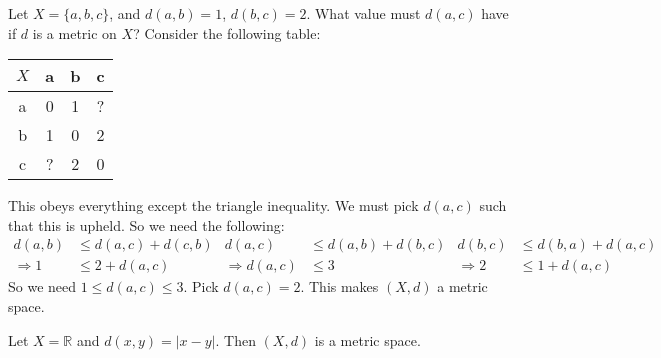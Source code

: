 \documentclass[crop=false,class=book,oneside]{standalone}
\begin{document}
            \begin{example}
                Let $X=\{a,b,c\}$, and
                $d(a,b)=1$, $d(b,c)=2$. What value
                must $d(a,c)$ have if $d$ is a metric on $X$?
                Consider the following table:
                \begin{table}[H]
                    \captionsetup{type=table}
                    \centering
                    \begin{tabular}{|c|c|c|c|}
                        \hline
                        $X$&a&b&c\\
                        \hline
                        a&0&1&?\\
                        \hline
                        b&1&0&2\\
                        \hline
                        c&?&2&0\\
                        \hline
                    \end{tabular}
                \end{table}
                This obeys everything except the triangle
                inequality. We must pick $d(a,c)$
                such that this is upheld.
                So we need the following:
                \begin{align*}
                    d(a,b)&\leq{d(a,c)+d(c,b)}&
                    d(a,c)&\leq{d(a,b)+d(b,c)}&
                    d(b,c)&\leq{d(b,a)+d(a,c)}\\
                    \Rightarrow{1}&\leq{2+d(a,c)}&
                    \Rightarrow{d(a,c)}&\leq{3}&
                    \Rightarrow{2}&\leq{1+d(a,c)}
                \end{align*}
                So we need $1\leq{d(a,c)}\leq{3}$.
                Pick $d(a,c)=2$.
                This makes $(X,d)$ a metric space.
            \end{example}
            \begin{example}
                Let $X=\mathbb{R}$ and $d(x,y)=|x-y|$.
                Then $(X,d)$ is a metric space.
            \end{example}
\end{document}
